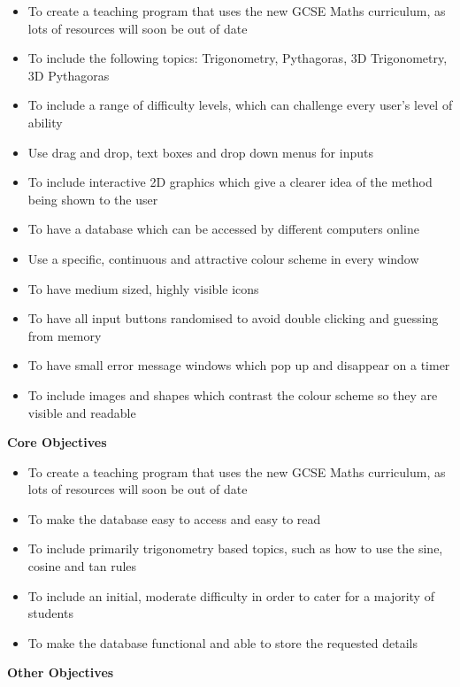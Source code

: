 \begin{itemize}
	\item To create a teaching program that uses the new GCSE Maths curriculum, as lots of resources will soon be out of date
	\item To include the following topics: Trigonometry, Pythagoras, 3D Trigonometry, 3D Pythagoras
	\item To include a range of difficulty levels, which can challenge every user's level of ability
	\item Use drag and drop, text boxes and drop down menus for inputs
	\item To include interactive 2D graphics which give a clearer idea of the method being shown to the user
	\item To have a database which can be accessed by different computers online
	\item Use a specific, continuous and attractive colour scheme in every window
	\item To have medium sized, highly visible icons
	\item To have all input buttons randomised to avoid double clicking and guessing from memory
	\item To have small error message windows which pop up and disappear on a timer
	\item To include images and shapes which contrast the colour scheme so they are visible and readable
\end{itemize}

\textbf{Core Objectives}

\begin{itemize}
	\item To create a teaching program that uses the new GCSE Maths curriculum, as lots of resources will soon be out of date
	\item To make the database easy to access and easy to read
	\item To include primarily trigonometry based topics, such as how to use the sine, cosine and tan rules
	\item To include an initial, moderate difficulty in order to cater for a majority of students
	\item To make the database functional and able to store the requested details
\end{itemize}

\textbf{Other Objectives}

